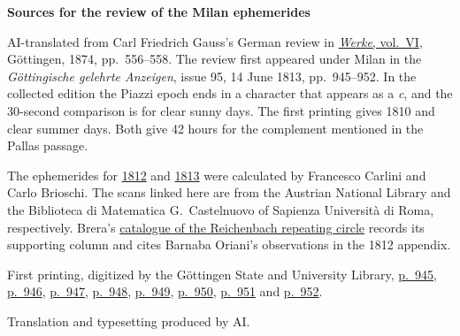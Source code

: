 \clearpage\thispagestyle{empty}
\begin{center}\textbf{Sources for the review of the Milan ephemerides}\end{center}
\noindent AI-translated from Carl Friedrich Gauss's German review in \href{https://gdz.sub.uni-goettingen.de/id/PPN236007467}{\emph{Werke}, vol.\ VI}, Göttingen, 1874, pp.\ 556--558. The review first appeared under Milan in the \emph{Göttingische gelehrte Anzeigen}, issue 95, 14 June 1813, pp.\ 945--952. In the collected edition the Piazzi epoch ends in a character that appears as a \emph{c}, and the 30-second comparison is for clear sunny days. The first printing gives 1810 and clear summer days. Both give 42 hours for the complement mentioned in the Pallas passage.

\par\smallskip\noindent The ephemerides for \href{https://books.google.it/books?id=GDlZAAAAcAAJ}{1812} and \href{https://books.google.it/books?id=4HCOwKAJ28kC}{1813} were calculated by Francesco Carlini and Carlo Brioschi. The scans linked here are from the Austrian National Library and the Biblioteca di Matematica G.~Castelnuovo of Sapienza Università di Roma, respectively. Brera's \href{https://www.beniculturali.inaf.it/opac/pst-iccd/circolo-moltiplicatore_13070}{catalogue of the Reichenbach repeating circle} records its supporting column and cites Barnaba Oriani's observations in the 1812 appendix.

\par\smallskip\noindent First printing, digitized by the Göttingen State and University Library, \href{https://images.p.sub.uni-goettingen.de/iiif/image/gdz:PPN319721507_1813:00000949/full/1650,/0/default.jpg}{p.\ 945}, \href{https://images.p.sub.uni-goettingen.de/iiif/image/gdz:PPN319721507_1813:00000950/full/1650,/0/default.jpg}{p.\ 946}, \href{https://images.p.sub.uni-goettingen.de/iiif/image/gdz:PPN319721507_1813:00000951/full/1650,/0/default.jpg}{p.\ 947}, \href{https://images.p.sub.uni-goettingen.de/iiif/image/gdz:PPN319721507_1813:00000952/full/1650,/0/default.jpg}{p.\ 948}, \href{https://images.p.sub.uni-goettingen.de/iiif/image/gdz:PPN319721507_1813:00000953/full/1650,/0/default.jpg}{p.\ 949}, \href{https://images.p.sub.uni-goettingen.de/iiif/image/gdz:PPN319721507_1813:00000954/full/1650,/0/default.jpg}{p.\ 950}, \href{https://images.p.sub.uni-goettingen.de/iiif/image/gdz:PPN319721507_1813:00000955/full/1650,/0/default.jpg}{p.\ 951} and \href{https://images.p.sub.uni-goettingen.de/iiif/image/gdz:PPN319721507_1813:00000956/full/1650,/0/default.jpg}{p.\ 952}.

\par\smallskip\noindent Translation and typesetting produced by AI.
\clearpage
